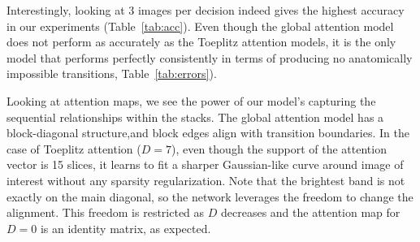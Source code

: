 \documentclass{article}
\begin{document}
Interestingly, looking at 3 images per decision indeed gives the highest accuracy in our experiments (Table~\ref{tab:acc}). Even though the global attention model does not perform as accurately as the Toeplitz attention models, it is the only model that performs perfectly consistently in terms of producing no anatomically impossible transitions, Table~\ref{tab:errors}). 

Looking at attention maps, we see the power of our model's capturing the sequential relationships within the stacks. The global attention model has a block-diagonal structure,and block edges align with transition boundaries. In the case of Toeplitz attention ($D=7$), even though the support of the attention vector is 15 slices, it learns to fit a sharper Gaussian-like curve around image of interest without any sparsity regularization. Note that the brightest band is not exactly on the main diagonal, so the network leverages the freedom to change the alignment. This freedom is restricted as $D$ decreases and the attention map for $D=0$ is an identity matrix, as expected.

\begin{table}[htbp]
\caption{Accuracy, sensitivity, and specificity for each class. Values for experiments not conducted in this work are taken from \cite{bozkurt2017delineation}}
  \centering
  \label{tab:acc}%
\end{table}%
\end{document}
